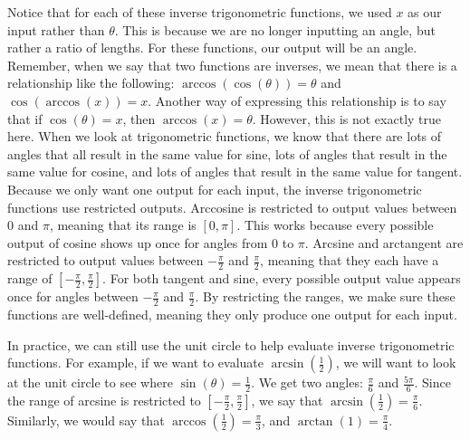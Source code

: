 Notice that for each of these inverse trigonometric functions, we used $x$ as our input rather than $\theta$. This is because we are no longer inputting an angle, but rather a ratio of lengths. For these functions, our output will be an angle. Remember, when we say that two functions are inverses, we mean that there is a relationship like the following: $\arccos{(\cos{(\theta)})}=\theta$ and $\cos{(\arccos{(x)})} = x$. Another way of expressing this relationship is to say that if $\cos{(\theta)} =x$, then $\arccos{(x)} = \theta$. However, this is not exactly true here. When we look at trigonometric functions, we know that there are lots of angles that all result in the same value for sine, lots of angles that result in the same value for cosine, and lots of angles that result in the same value for tangent. Because we only want one output for each input, the inverse trigonometric functions use restricted outputs. Arccosine is restricted to output values between $0$ and $\pi$, meaning that its range is $[0,\pi]$. This works because every possible output of cosine shows up once for angles from 0 to $\pi$. Arcsine and arctangent are restricted to output values between $-\frac{\pi}{2}$ and $\frac{\pi}{2}$, meaning that they each have a range of $[-\frac{\pi}{2}, \frac{\pi}{2}]$. For both tangent and sine, every possible output value appears once for angles between $-\frac{\pi}{2}$ and $\frac{\pi}{2}$. By restricting the ranges, we make sure these functions are well-defined, meaning they only produce one output for each input.

In practice, we can still use the unit circle to help evaluate inverse trigonometric functions. For example, if we want to evaluate $\arcsin{(\frac{1}{2})}$, we will want to look at the unit circle to see where $\sin{(\theta)}=\frac{1}{2}$. We get two angles: $\frac{\pi}{6}$ and $\frac{5\pi}{6}$. Since the range of arcsine is restricted to $[-\frac{\pi}{2},\frac{\pi}{2}]$, we say that $\arcsin{(\frac{1}{2})} = \frac{\pi}{6}$. Similarly, we would say that $\arccos{(\frac{1}{2})} = \frac{\pi}{3}$, and $\arctan{(1)} =\frac{\pi}{4}$.




